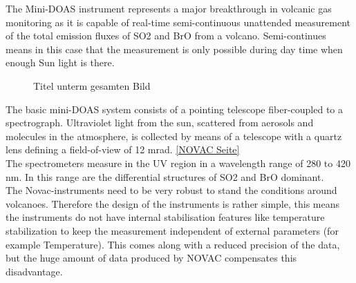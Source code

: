 \documentclass  [
  paper    = a4,
  BCOR     = 10mm,
  twoside,
  fontsize = 12pt,
  fleqn,
  toc      = bibnumbered,
  toc      = listofnumbered,
  numbers  = noendperiod,
  headings = normal,
  listof   = leveldown,
  version  = 3.03
]                                       {scrreprt}
\begin{document}
		The  Mini-DOAS  instrument  represents  a  major  breakthrough  in  volcanic  gas	monitoring as it is capable of real-time semi-continuous unattended measurement of the total emission fluxes of  SO2	and BrO from a volcano. Semi-continues means in this case that the measurement is only possible during day time when enough Sun light is there.\\
		\begin{figure}
			\caption{Titel unterm gesamten Bild}
		\end{figure}
		The  basic  mini-DOAS  system  consists  of  a  pointing  telescope  fiber-coupled  to  a  spectrograph.  
		Ultraviolet light from the sun, scattered from aerosols and molecules in the atmosphere, is collected by 
		means  of  a  telescope  with  a  quartz  lens  defining  a  field-of-view  of  12  mrad.
		\ref{NOVAC Seite} \\
		The spectrometers measure in the UV region in a wavelength range of 280 to 420 nm. In this range are the differential structures of SO2 and BrO dominant.
		\\
 		The Novac-instruments need to be very robust to stand the conditions around volcanoes. Therefore the design of the instruments is rather simple, this means the instruments do not have internal stabilisation features like temperature stabilization to keep the measurement independent of external parameters (for example Temperature).
		This comes along with a reduced precision of the data, but the huge amount of data produced by NOVAC compensates this disadvantage.  
	
\end{document}
